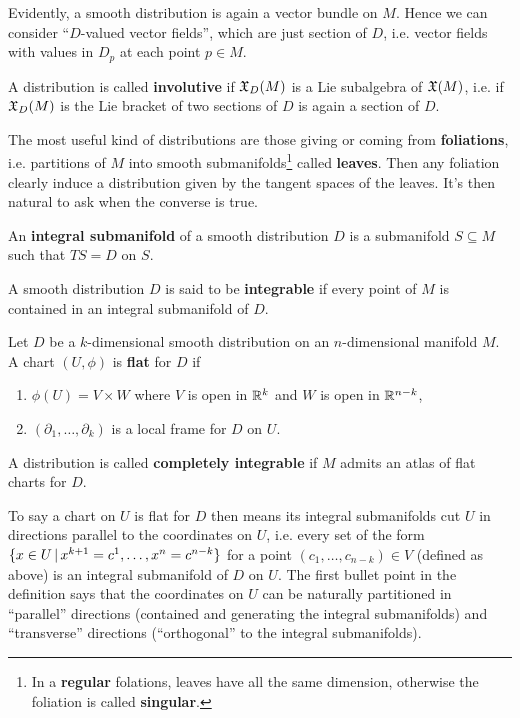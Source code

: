 \documentclass[main.tex]{subfiles}
\begin{document}
Evidently, a smooth distribution is again a vector bundle on $M$. Hence we can consider ``$D$-valued vector fields'', which are just section of $D$, i.e. vector fields with values in $D_p$ at each point $p \in M$.

\begin{definition}
	A distribution is called \textbf{involutive} if $\mathfrak{X}_D(M)$ is a Lie subalgebra of $\mathfrak{X}(M)$, i.e. if $\mathfrak{X}_D(M)$ is the Lie bracket of two sections of $D$ is again a section of $D$.
\end{definition}

The most useful kind of distributions are those giving or coming from \textbf{foliations}, i.e. partitions of $M$ into smooth submanifolds\footnote{In a \textbf{regular} folations, leaves have all the same dimension, otherwise the foliation is called \textbf{singular}.} called \textbf{leaves}. Then any foliation clearly induce a distribution given by the tangent spaces of the leaves. It's then natural to ask when the converse is true.

\begin{definition}
	An \textbf{integral submanifold} of a smooth distribution $D$ is a submanifold $S \subseteq M$ such that $TS = D$ on $S$.
\end{definition}

\begin{definition}
	A smooth distribution $D$ is said to be \textbf{integrable} if every point of $M$ is contained in an integral submanifold of $D$.
\end{definition}

\begin{definition}
	Let $D$ be a $k$-dimensional smooth distribution on an $n$-dimensional manifold $M$. A chart $(U,\phi)$ is \textbf{flat} for $D$ if
	\begin{enumerate}
		\item $\phi(U) = V \times W$ where $V$ is open in $\mathbb{R}^k$ and $W$ is open in $\mathbb{R}^{n-k}$,
		\item $(\partial_1, \ldots, \partial_k)$ is a local frame for $D$ on $U$.
	\end{enumerate}
	A distribution is called \textbf{completely integrable} if $M$ admits an atlas of flat charts for $D$.
\end{definition}

To say a chart on $U$ is flat for $D$ then means its integral submanifolds cut $U$ in directions parallel to the coordinates on $U$, i.e. every set of the form $\{x \in U \,|\, x^{k+1} = c^1, \ldots, x^n=c^{n-k}\}$ for a point $(c_1, \ldots, c_{n-k}) \in V$ (defined as above) is an integral submanifold of $D$ on $U$. The first bullet point in the definition says that the coordinates on $U$ can be naturally partitioned in ``parallel'' directions (contained and generating the integral submanifolds) and ``transverse'' directions (``orthogonal'' to the integral submanifolds).
\end{document}
